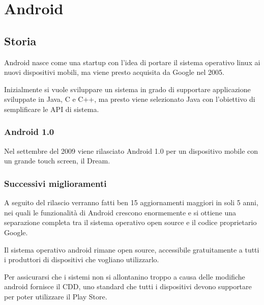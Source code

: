 \section{Android}

\subsection{Storia}
Android nasce come una startup con l'idea di portare il sistema operativo linux ai nuovi dispositivi mobili, ma viene presto acquisita da Google nel 2005.

\spacer
Inizialmente si vuole sviluppare un sistema in grado di supportare applicazione sviluppate in Java, C e C++, ma presto viene selezionato Java con l'obiettivo di semplificare le API di sistema.

\subsubsection{Android 1.0}
Nel settembre del 2009 viene rilasciato Android 1.0 per un dispositivo mobile con un grande touch screen, il Dream.

\subsubsection{Successivi miglioramenti}
A seguito del rilascio verranno fatti ben 15 aggiornamenti maggiori in soli 5 anni, nei quali le funzionalità di Android crescono enormemente e si ottiene una separazione completa tra il sistema operativo open source e il codice proprietario Google.

\spacer
Il sistema operativo android rimane open source, accessibile gratuitamente a tutti i produttori di dispositivi che vogliano utilizzarlo.

Per assicurarsi che i sistemi non si allontanino troppo a causa delle modifiche android fornisce il CDD, uno standard che tutti i dispositivi devono supportare per poter utilizzare il Play Store.

